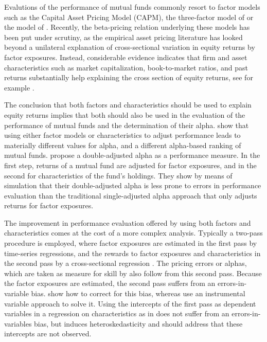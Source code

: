 Evalutions of the performance of mutual funds commonly resort to factor models such as the Capital Asset Pricing Model (CAPM), the three-factor model of \citet{fama1993common} or the model of \citet{carhart1997persistence}. Recently, the beta-pricing relation underlying these models has been put under scrutiny, as the empirical asset pricing literature has looked beyond a unilateral explanation of cross-sectional variation in equity returns by factor exposures. Instead, considerable evidence indicates that firm and asset characteristics such as market capitalization, book-to-market ratios, and past returns substantially help explaining the cross section of equity returns, see for example \citet{brennan1998alternative,avramov2006asset,chordia2015cross}. 

The conclusion that both factors and characteristics should be used to explain equity returns implies that both should also be used in the evaluation of the performance of mutual funds and the determination of their alpha. \citet{chen2018characteristics} show that using either factor models or characteristics to adjust performance leads to materially different values for alpha, and a different alpha-based ranking of mutual funds. \citet{busse2017double} propose a double-adjusted alpha as a performance measure. In the first step, returns of a mutual fund are adjusted for factor exposures, and in the second for characteristics of the fund's holdings. They show by means of simulation that their double-adjusted alpha is less prone to errors in performance evaluation than the traditional single-adjusted alpha approach that only adjusts returns for factor exposures.

The improvement in performance evaluation offered by using both factors and characteristics comes at the cost of a more complex analysis. Typically a two-pass procedure is employed, where factor exposures are estimated in the first pass by time-series regressions, and the rewards to factor exposures and characteristics in the second pass by a cross-sectional regression \citep[cf.][]{chordia2015cross,busse2017double}. The pricing errors or alphas, which are taken as measure for skill by \citet{busse2017double} also follow from this second pass. Because the factor exposures are estimated, the second pass suffers from an errors-in-variable bias. \citet{chordia2015cross} show how to correct for this bias, whereas \citet{jegadeesh2016empirical} use an instrumental variable approach to solve it. Using the intercepts of the first pass as dependent variables in a regression on characteristics as in \citet{busse2017double} does not suffer from an errors-in-variables bias, but induces heteroskedasticity and should address that these intercepts are not observed.

